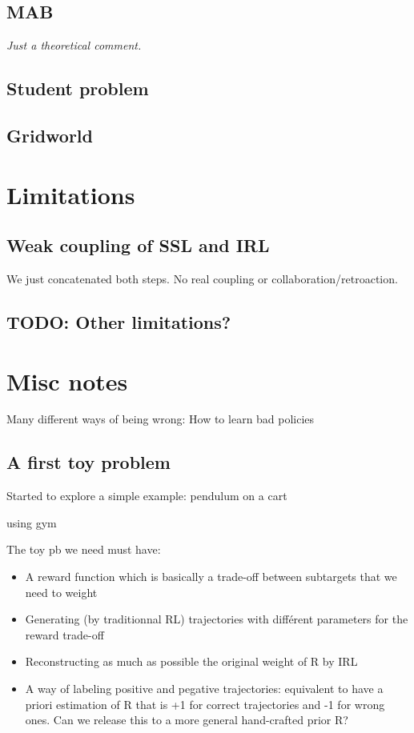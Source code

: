 \documentclass{article}
\begin{document}
\subsection{MAB}

\emph{Just a theoretical comment.}

\subsection{Student problem}

\subsection{Gridworld}


\section{Limitations}

\subsection{Weak coupling of SSL and IRL}

We just concatenated both steps. No real coupling or collaboration/retroaction.

\subsection{TODO: Other limitations?}

\section{Misc notes}

Many different ways of being wrong: How to learn bad policies



\subsection{A first toy problem}

Started to explore a simple example: pendulum on a cart

using gym

The toy pb we need must have:

\begin{itemize}
    \item A reward function which is basically a trade-off between subtargets that we need to weight
    \item Generating (by traditionnal RL) trajectories with différent parameters for the reward trade-off
    \item Reconstructing as much as possible the original weight of R by IRL
    \item A way of labeling positive and pegative trajectories: equivalent to have a priori estimation of R that is +1 for correct trajectories and -1 for wrong ones. Can we release this to a more general hand-crafted prior R?
\end{itemize}
\end{document}
